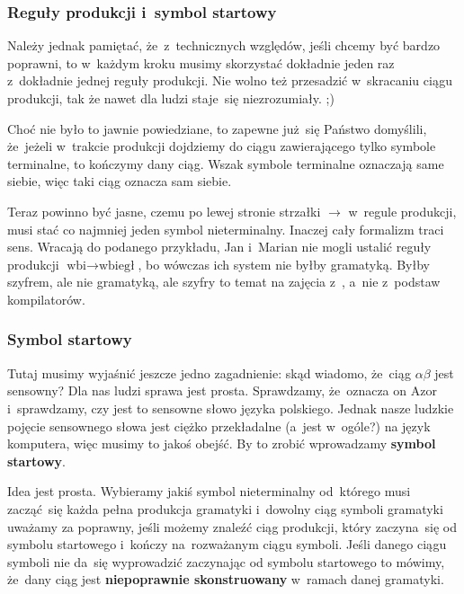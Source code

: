 \documentclass[10pt,t]{beamer}
\begin{document}
\begin{frame}
  \frametitle{Reguły produkcji i~symbol startowy}


  Należy jednak pamiętać, że~z~technicznych względów, jeśli chcemy być
  bardzo poprawni, to w~każdym kroku musimy skorzystać \alert{dokładnie}
  jeden raz z~\alert{dokładnie} jednej reguły produkcji. Nie wolno też
  przesadzić w~skracaniu ciągu produkcji, tak że nawet dla ludzi staje~się
  niezrozumiały. ;)

  Choć nie było to jawnie powiedziane, to zapewne już~się Państwo domyślili,
  że~jeżeli w~trakcie produkcji dojdziemy do ciągu zawierającego tylko
  symbole terminalne, to kończymy dany ciąg. Wszak symbole terminalne
  oznaczają same siebie, więc taki ciąg oznacza sam siebie.

  Teraz powinno być jasne, czemu po lewej stronie strzałki $\to$ w~regule
  produkcji, \alert{musi} stać co najmniej jeden symbol nieterminalny.
  Inaczej cały formalizm traci sens. Wracają do podanego przykładu,
  Jan i~Marian nie mogli ustalić reguły produkcji
  $\text{wbi} \to \text{wbiegł}$, bo wówczas ich system nie byłby gramatyką.
  Byłby szyfrem, ale nie gramatyką, ale szyfry to temat na zajęcia
  z~,
  a~nie z~podstaw kompilatorów.

\end{frame}





\begin{frame}
  \frametitle{Symbol startowy}


  Tutaj musimy wyjaśnić jeszcze jedno zagadnienie: skąd wiadomo,
  że~ciąg $\alpha\beta$ jest sensowny? Dla nas ludzi sprawa jest prosta. Sprawdzamy,
  że~oznacza on $\text{Azor}$ i~sprawdzamy, czy jest to sensowne słowo
  języka polskiego. Jednak nasze ludzkie pojęcie sensownego słowa jest
  ciężko przekładalne (a~jest w~ogóle?) na język komputera, więc musimy
  to jakoś obejść. By to zrobić wprowadzamy \textbf{symbol startowy}.

  Idea jest prosta. Wybieramy jakiś symbol nieterminalny od~którego musi
  zacząć~się każda pełna produkcja gramatyki i~dowolny ciąg symboli
  gramatyki uważamy za poprawny, jeśli możemy znaleźć ciąg produkcji, który
  zaczyna~się od symbolu startowego i~kończy na~rozważanym ciągu symboli.
  Jeśli danego ciągu symboli nie da~się wyprowadzić zaczynając od symbolu
  startowego to mówimy, że~dany ciąg jest \textbf{niepoprawnie
    skonstruowany} w~ramach danej gramatyki.

\end{frame}
\end{document}
